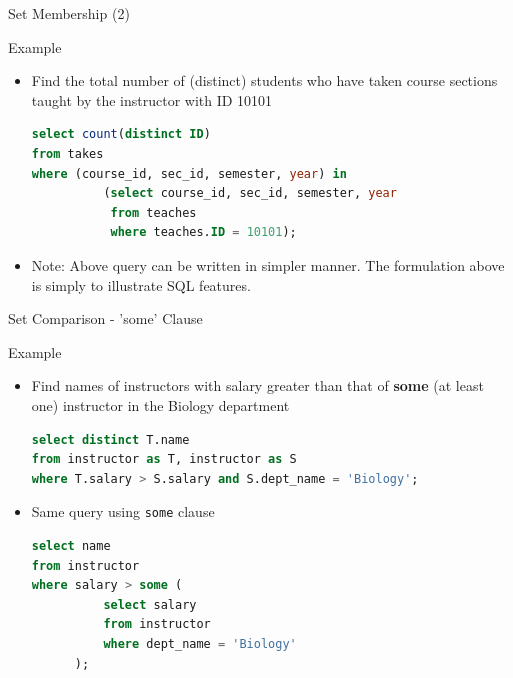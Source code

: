 \documentclass[aspectratio=169, xcolor=dvipsnames]{beamer}
\begin{document}
\begin{frame}[fragile]{Set Membership (2)}
    \begin{exampleblock}{Example}
        \begin{itemize}[<+->]
            \item Find the total number of (distinct) students who have taken course sections taught by the instructor with ID 10101
            \begin{lstlisting}[language=SQL, basicstyle=\ttfamily\scriptsize]
select count(distinct ID) 
from takes 
where (course_id, sec_id, semester, year) in 
          (select course_id, sec_id, semester, year 
           from teaches 
           where teaches.ID = 10101);
            \end{lstlisting}
            \item Note: Above query can be written in simpler manner. The formulation above is simply to illustrate SQL features.
        \end{itemize}
    \end{exampleblock}
\end{frame}

\begin{frame}[fragile]{Set Comparison - 'some' Clause}
    \begin{exampleblock}{Example}
        \begin{itemize}[<+->]
            \item Find names of instructors with salary greater than that of \textbf{some} (at least one) instructor in the Biology department
            \begin{lstlisting}[language=SQL, basicstyle=\ttfamily\scriptsize]
select distinct T.name 
from instructor as T, instructor as S 
where T.salary > S.salary and S.dept_name = 'Biology';
            \end{lstlisting}
            \item Same query using \texttt{some} clause
            \begin{lstlisting}[language=SQL, basicstyle=\ttfamily\scriptsize]
select name 
from instructor 
where salary > some ( 
          select salary 
          from instructor 
          where dept_name = 'Biology' 
      );
            \end{lstlisting}
        \end{itemize}
    \end{exampleblock}
\end{frame}
\end{document}

